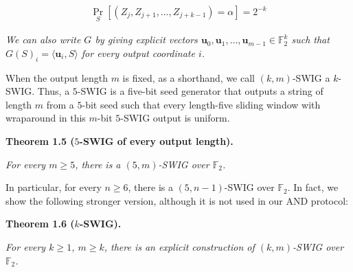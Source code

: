 \[\begin{gathered}
\Pr_{S}[(Z_{j},Z_{j+1},\ldots,Z_{j+k-1})=\alpha]=2^{-k}
\end{gathered}\]


\emph{We can also write $G$ by giving explicit vectors $\mathbf{u}_{0},\mathbf{u}_{1},\ldots,\mathbf{u}_{m-1}\in\mathbb{F}_{2}^{k}$ such that
$G(S)_{i}=\langle\mathbf{u}_{i},S\rangle$
for every output coordinate $i$.}\par






When the output length $m$ is fixed, as a shorthand, we call $(k,m)$-SWIG a
$k$-SWIG. Thus, a $5$-SWIG is a five-bit seed generator that outputs a string of length $m$ from a $5$-bit seed such that every length-five sliding window with wraparound in this $m$-bit $5$-SWIG output is uniform.\par





\par\medskip\noindent\textbf{
\textbf{Theorem 1.5}\textbf{ }($5$-SWIG of every output length)\textbf{.}
}\par



\emph{For every $m\geq 5$, there is a $(5,m)$-SWIG over $\mathbb{F}_{2}$.}\par






In particular, for every $n\geq 6$, there is a $(5,n-1)$-SWIG over $\mathbb{F}_{2}$. In fact,
we show the following stronger version, although it is not used in our AND protocol:\par





\par\medskip\noindent\textbf{
\textbf{Theorem 1.6}\textbf{ }($k$-SWIG)\textbf{.}
}\par



\emph{For every $k\geq 1$, $m\geq k$, there is an explicit construction of $(k,m)$-SWIG over $\mathbb{F}_{2}$.}\par



